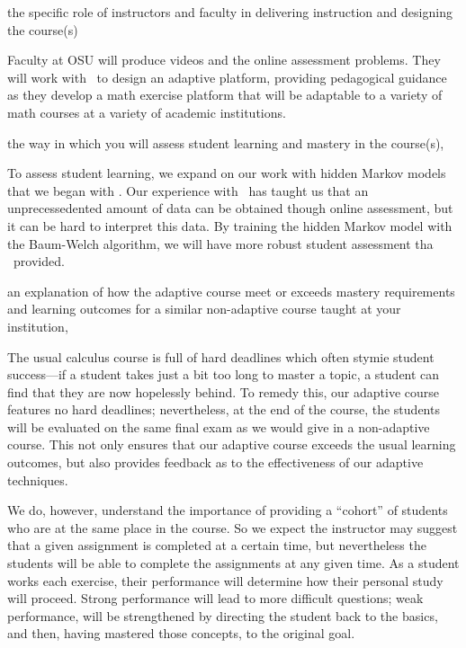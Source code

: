 \begin{subquestion}
 the specific role of instructors and faculty in delivering
 instruction and designing the course(s)
\end{subquestion}

Faculty at OSU will produce videos and the online assessment problems.
They will work with \gratisu\ to design an adaptive platform,
providing pedagogical guidance as they develop a math exercise
platform that will be adaptable to a variety of math courses at a
variety of academic institutions.

\begin{subquestion}
 the way in which you will assess student learning and mastery
 in the course(s), 
\end{subquestion}

To assess student learning, we expand on our work with hidden Markov
models that we began with \mooculus. Our experience with \mooculus\
has taught us that an unprecessedented amount of data can be obtained
though online assessment, but it can be hard to interpret this data.
By training the hidden Markov model with the Baum-Welch algorithm, we
will have more robust student assessment tha \mooculus\ provided.

\begin{subquestion}
 an explanation of how the adaptive course meet or exceeds
 mastery requirements and learning outcomes for a similar
 non-adaptive course taught at your institution, 
\end{subquestion}

The usual calculus course is full of hard deadlines which often stymie
student success---if a student takes just a bit too long to master a
topic, a student can find that they are now hopelessly behind.  To
remedy this, our adaptive course features no hard deadlines;
nevertheless, at the end of the course, the students will be evaluated
on the same final exam as we would give in a non-adaptive course.
This not only ensures that our adaptive course exceeds the usual
learning outcomes, but also provides feedback as to the effectiveness
of our adaptive techniques.

We do, however, understand the importance of providing a ``cohort'' of
students who are at the same place in the course.  So we expect the
instructor may suggest that a given assignment is completed at a
certain time, but nevertheless the students will be able to complete
the assignments at any given time. As a student works each exercise,
their performance will determine how their personal study will
proceed.  Strong performance will lead to more difficult questions;
weak performance, will be strengthened by directing the student back
to the basics, and then, having mastered those concepts, to the
original goal.

